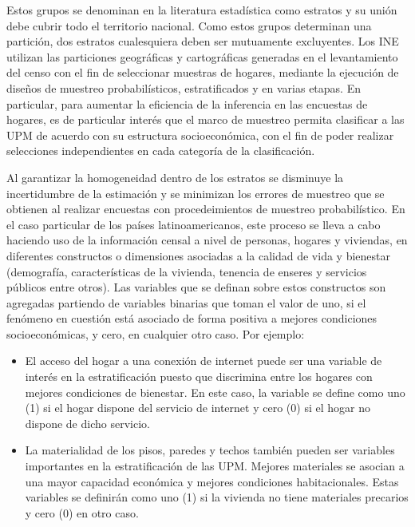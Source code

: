\documentclass[
  12pt,
  spanish,
]{book}
\providecommand{\tightlist}{%
  \setlength{\itemsep}{0pt}\setlength{\parskip}{0pt}}
\begin{document}
Estos grupos se denominan en la literatura estadística como estratos y su unión debe cubrir todo el territorio nacional. Como estos grupos determinan una partición, dos estratos cualesquiera deben ser mutuamente excluyentes. Los INE utilizan las particiones geográficas y cartográficas generadas en el levantamiento del censo con el fin de seleccionar muestras de hogares, mediante la ejecución de diseños de muestreo probabilísticos, estratificados y en varias etapas. En particular, para aumentar la eficiencia de la inferencia en las encuestas de hogares, es de particular interés que el marco de muestreo permita clasificar a las UPM de acuerdo con su estructura socioeconómica, con el fin de poder realizar selecciones independientes en cada categoría de la clasificación.

Al garantizar la homogeneidad dentro de los estratos se disminuye la incertidumbre de la estimación y se minimizan los errores de muestreo que se obtienen al realizar encuestas con procedeimientos de muestreo probabilístico. En el caso particular de los países latinoamericanos, este proceso se lleva a cabo haciendo uso de la información censal a nivel de personas, hogares y viviendas, en diferentes constructos o dimensiones asociadas a la calidad de vida y bienestar (demografía, características de la vivienda, tenencia de enseres y servicios públicos entre otros). Las variables que se definan sobre estos constructos son agregadas partiendo de variables binarias que toman el valor de uno, si el fenómeno en cuestión está asociado de forma positiva a mejores condiciones socioeconómicas, y cero, en cualquier otro caso. Por ejemplo:

\begin{itemize}
\tightlist
\item
  El acceso del hogar a una conexión de internet puede ser una variable de interés en la estratificación puesto que discrimina entre los hogares con mejores condiciones de bienestar. En este caso, la variable se define como uno (1) si el hogar dispone del servicio de internet y cero (0) si el hogar no dispone de dicho servicio.
\item
  La materialidad de los pisos, paredes y techos también pueden ser variables importantes en la estratificación de las UPM. Mejores materiales se asocian a una mayor capacidad económica y mejores condiciones habitacionales. Estas variables se definirán como uno (1) si la vivienda no tiene materiales precarios y cero (0) en otro caso.
\end{itemize}
\end{document}
